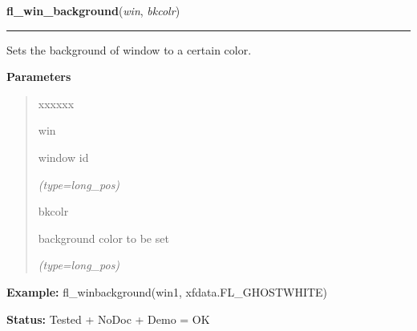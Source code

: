 \hspace{.8\funcindent}\begin{boxedminipage}{\funcwidth}

    \raggedright \textbf{fl\_win\_background}(\textit{win}, \textit{bkcolr})

    \vspace{-1.5ex}

    \rule{\textwidth}{0.5\fboxrule}
\setlength{\parskip}{2ex}
    Sets the background of window to a certain color.

\setlength{\parskip}{1ex}
      \textbf{Parameters}
      \vspace{-1ex}

      \begin{quote}
        \begin{Ventry}{xxxxxx}

          \item[win]

          window id

            {\it (type=long\_pos)}

          \item[bkcolr]

          background color to be set

            {\it (type=long\_pos)}

        \end{Ventry}

      \end{quote}

\textbf{Example:} fl\_winbackground(win1, xfdata.FL\_GHOSTWHITE)



\textbf{Status:} Tested + NoDoc + Demo = OK



    \end{boxedminipage}

    \label{xformslib:flxbasic:fl_winstepsize}

    \vspace{0.5ex}

